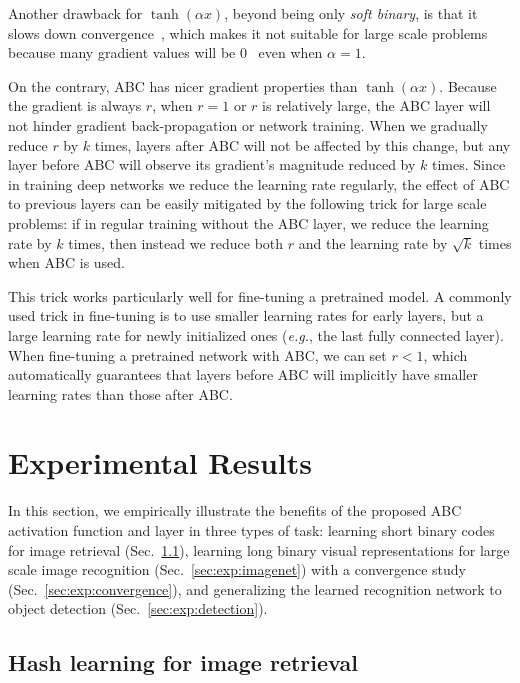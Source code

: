 \documentclass[runningheads]{llncs}
\begin{document}
Another drawback for $\tanh(\alpha x)$, beyond being only \emph{soft binary}, is that it slows down convergence~\cite{Liu16CVPR_r12}, which makes it not suitable for large scale problems because many gradient values will be 0~\cite{ReLU} even when $\alpha=1$.

On the contrary, ABC has nicer gradient properties than $\tanh(\alpha x)$. Because the gradient is always $r$, when $r=1$ or $r$ is relatively large, the ABC layer will not hinder gradient back-propagation or network training. When we gradually reduce $r$ by $k$ times, layers after ABC will not be affected by this change, but any layer before ABC will observe its gradient's magnitude reduced by $k$ times. Since in training deep networks we reduce the learning rate regularly, the effect of ABC to previous layers can be easily mitigated by the following trick for large scale problems: if in regular training without the ABC layer, we reduce the learning rate by $k$ times, then instead we reduce both $r$ and the learning rate by $\sqrt{k}$ times when ABC is used.

This trick works particularly well for fine-tuning a pretrained model. A commonly used trick in fine-tuning is to use smaller learning rates for early layers, but a large learning rate for newly initialized ones (\emph{e.g.}, the last fully connected layer). When fine-tuning a pretrained network with ABC, we can set $r<1$, which automatically guarantees that layers before ABC will implicitly have smaller learning rates than those after ABC.

\section{Experimental Results}

In this section, we empirically illustrate the benefits of the proposed ABC activation function and layer in three types of task: learning short binary codes for image retrieval (Sec.~\ref{sec:exp:hashing}), learning long binary visual representations for large scale image recognition (Sec.~\ref{sec:exp:imagenet}) with a convergence study (Sec.~\ref{sec:exp:convergence}), and generalizing the learned recognition network to object detection (Sec.~\ref{sec:exp:detection}).

\subsection{Hash learning for image retrieval} \label{sec:exp:hashing}
\end{document}
